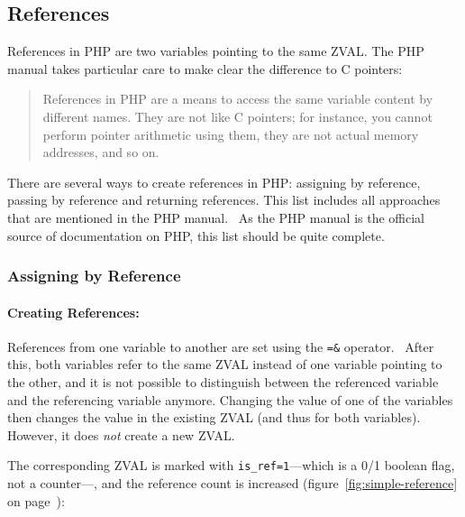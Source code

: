 \subsection{References}
\label{sec:references}

References in PHP are two variables pointing to the same ZVAL. The PHP manual takes particular care to make clear the difference to C pointers:~\cite{php-manual-what-references-are}\cite{php-manual-what-references-are-not}

\begin{quote}
References in PHP are a means to access the same variable content by different names. They are not like C pointers; for instance, you cannot perform pointer arithmetic using them, they are not actual memory addresses, and so on.
\end{quote}

There are several ways to create references in PHP: assigning by reference, passing by reference and returning references. This list includes all approaches that are mentioned in the PHP manual.~\cite{php-manual-references} As the PHP manual is the official source of documentation on PHP, this list should be quite complete.


\subsubsection{Assigning by Reference}

\paragraph{Creating References:}

References from one variable to another are set using the \texttt{=\&} operator.~\cite[page 129]{wenz-php53}\cite{php-manual-what-references-do} After this, both variables refer to the same ZVAL instead of one variable pointing to the other, and it is not possible to distinguish between the referenced variable and the referencing variable anymore. Changing the value of one of the variables then changes the value in the existing ZVAL (and thus for both variables). However, it does \emph{not} create a new ZVAL.

The corresponding ZVAL is marked with \texttt{is\_ref=1}---which is a 0/1 boolean flag, not a counter---, and the reference count is increased (figure~\ref{fig:simple-reference} on page~\pageref{fig:simple-reference}):

